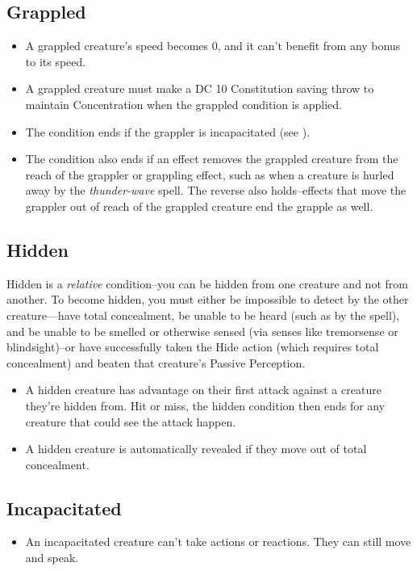 \subsection{Grappled\label{condition:grappled}}
\begin{itemize}
\item A grappled creature's speed becomes 0, and it can't benefit from any bonus to its speed.
\item A grappled creature must make a DC 10 Constitution saving throw to maintain Concentration when the grappled condition is applied.
\item The condition ends if the grappler is incapacitated (see ).
\item The condition also ends if an effect removes the grappled creature from the reach of the grappler or grappling effect, such as when a creature is hurled away by the \textit{thunder-wave} spell. The reverse also holds--effects that move the grappler out of reach of the grappled creature end the grapple as well.
\end{itemize}

\subsection{Hidden}\label{condition:hidden}
Hidden is a \textit{relative} condition--you can be hidden from one creature and not from another. To become hidden, you must either be impossible to detect by the other creature---have total concealment, be unable to be heard (such as by the  spell), and be unable to be smelled or otherwise sensed (via senses like tremorsense or blindsight)--or have successfully taken the Hide action (which requires total concealment) and beaten that creature's Passive Perception.
\begin{itemize}
	\item A hidden creature has advantage on their first attack against a creature they're hidden from. Hit or miss, the hidden condition then ends for any creature that could see the attack happen.
	\item A hidden creature is automatically revealed if they move out of total concealment.
\end{itemize}

\subsection{Incapacitated\label{condition:incapacitated}}
\begin{itemize}
\item An incapacitated creature can't take actions or reactions. They can still move and speak.
\end{itemize}

